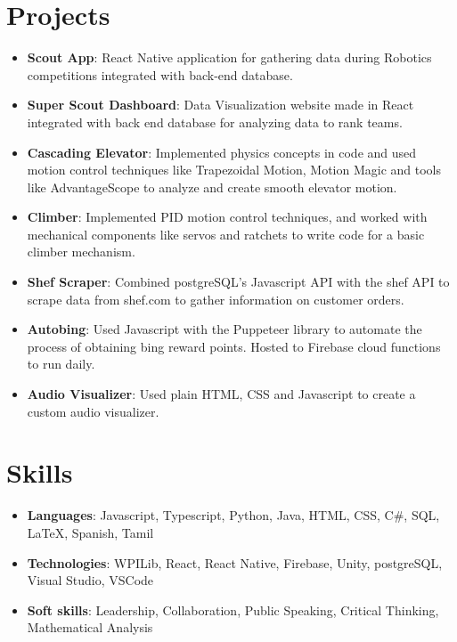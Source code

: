 \documentclass[letterpaper,11pt]{article}
\newcommand{\resumeItem}[2]{
  \item\small{
    \textbf{#1}{: #2 \vspace{-2pt}}
  }
}
\newcommand{\resumeSubItem}[2]{\resumeItem{#1}{#2}\vspace{-4pt}}
\newcommand{\resumeSubHeadingListStart}{\begin{itemize}[leftmargin=*]}
\newcommand{\resumeSubHeadingListEnd}{\end{itemize}}
\begin{document}
\section{Projects}
  \resumeSubHeadingListStart
    \resumeSubItem{Scout App}
      {React Native application for gathering data during Robotics competitions integrated with back-end database.}
    \resumeSubItem{Super Scout Dashboard}
      {Data Visualization website made in React integrated with back end database for analyzing data to rank teams.}
    \resumeSubItem{Cascading Elevator}
      {Implemented physics concepts in code and used motion control techniques like Trapezoidal Motion, Motion Magic and tools like AdvantageScope to analyze and create smooth elevator motion.}
    \resumeSubItem{Climber}
        {Implemented PID motion control techniques, and worked with mechanical components like servos and ratchets to write code for a basic climber mechanism.}
    \resumeItem{Shef Scraper}
        {Combined postgreSQL's Javascript API with the shef API to scrape data from shef.com to gather information on customer orders.}
    \resumeItem{Autobing}
        {Used Javascript with the Puppeteer library to automate the process of obtaining bing reward points. Hosted to Firebase cloud functions to run daily.}
    \resumeItem{Audio Visualizer}
        {Used plain HTML, CSS and Javascript to create a custom audio visualizer.}
  \resumeSubHeadingListEnd

%
\section{Skills}
 \resumeSubHeadingListStart
   \resumeSubItem{Languages}{Javascript, Typescript, Python, Java, HTML, CSS, C\#, SQL, LaTeX, Spanish, Tamil}
    \resumeSubItem{Technologies}{WPILib, React, React Native, Firebase, Unity, postgreSQL, Visual Studio, VSCode}
     \resumeSubItem{Soft skills}{Leadership, Collaboration, Public Speaking, Critical Thinking, Mathematical Analysis}
 \resumeSubHeadingListEnd


\end{document}
